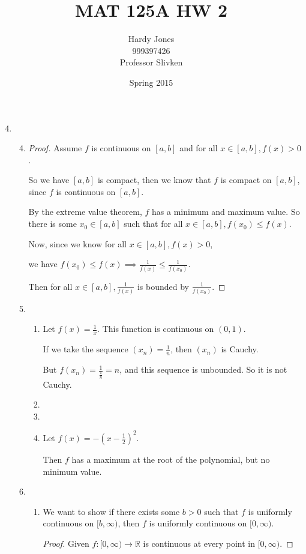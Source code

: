 \documentclass[12pt,letterpaper]{article}
\title{MAT 125A HW 2\vspace{-2ex}}
\author{Hardy Jones\\
        999397426\\
        Professor Slivken\vspace{-2ex}}
\date{Spring 2015}
\newcommand\uc{uniformly continuous }
\begin{document}
  \maketitle

  \begin{enumerate}
    \setcounter{enumi}{3}
    \item
      \begin{enumerate}
        \setcounter{enumii}{3}
        \item

          \begin{proof}
            Assume $f$ is continuous on $[a, b]$ and for all $x \in [a, b], f(x) > 0$.

            So we have $[a, b]$ is compact,
            then we know that $f$ is compact on $[a, b]$, since $f$ is continuous on $[a, b]$.

            By the extreme value theorem, $f$ has a minimum and maximum value.
            So there is some $x_0 \in [a, b]$ such that for all $x \in [a, b], f(x_0) \leq f(x)$.

            Now, since we know for all $x \in [a, b], f(x) > 0$,

            we have $f(x_0) \leq f(x) \implies \frac{1}{f(x)} \leq \frac{1}{f(x_0)}$.

            Then for all $x \in [a, b], \frac{1}{f(x)}$ is bounded by $\frac{1}{f(x_0)}$.
          \end{proof}
        \setcounter{enumii}{5}
        \item
          \begin{enumerate}
            \item
              Let $f(x) = \frac{1}{x}$.
              This function is continuous on $(0, 1)$.

              If we take the sequence $(x_n) = \frac{1}{n}$,
              then $(x_n)$ is Cauchy.

              But $f(x_n) = \frac{1}{\frac{1}{n}} = n$, and this sequence is unbounded.
              So it is not Cauchy.
            \item
            \item
            \item
              Let $f(x) = -\left(x - \frac{1}{2}\right)^2$.

              Then $f$ has a maximum at the root of the polynomial, but no minimum value.
          \end{enumerate}
        \setcounter{enumii}{7}
        \item
          \begin{enumerate}
            \item
              We want to show
              if there exists some $b > 0$ such that $f$ is \uc on $[b, \infty)$,
              then $f$ is \uc on $[0, \infty)$.
              \begin{proof}
                Given $f : [0, \infty) \to \mathbb{R}$ is continuous at every point in $[0, \infty)$.


\end{proof}
\end{enumerate}
\end{enumerate}
\end{enumerate}
\end{document}
